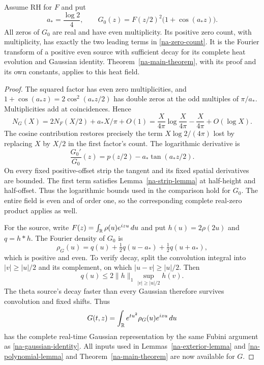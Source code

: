 \begin{proposition}
\label{na-all-multiple-control}
Assume RH for $F$ and put
\begin{equation}
 a_* =\frac{\log2}{4},\qquad
 G_0(z)=F(z/2)^2\bigl(1+\cos(a_*z)\bigr).
 \label{na-control-field}
\end{equation}
All zeros of $G_0$ are real and have even multiplicity. Its positive
zero count, with multiplicity, has exactly the two leading terms in
\eqref{na-zero-count}. It is the Fourier transform of a positive even
source with sufficient decay for its complete heat evolution and
Gaussian identity. Theorem~\ref{na-main-theorem}, with its proof and
its own constants, applies to this heat field.
\end{proposition}
\begin{proof}
The squared factor has even zero multiplicities, and
$1+\cos(a_*z)=2\cos^2(a_*z/2)$ has double zeros at the odd
multiples of $\pi/a_*$. Multiplicities add at coincidences. Hence
\[
 N_G(X)=2N_F(X/2)+a_*X/\pi+O(1)
       =\frac X{4\pi}\log\frac X{4\pi}-\frac X{4\pi}
          +O(\log X).
\]
The cosine contribution restores precisely the term
$X\log2/(4\pi)$ lost by replacing $X$ by $X/2$ in the first
factor's count. The logarithmic derivative is
\begin{equation}
 \frac{G_0'}{G_0}(z)=p(z/2)-a_*\tan(a_*z/2).
 \label{na-control-log-derivative}
\end{equation}
On every fixed positive-offset strip the tangent and its fixed
spatial derivatives are bounded. The first term satisfies
Lemma~\ref{na-strip-lemma} at half-height and half-offset.
Thus the logarithmic bounds used in the comparison hold for $G_0$.
The entire field is even and of order one, so the corresponding
complete real-zero product applies as well.

For the source, write $F(z)=\int_\mathbb R\rho(u)e^{izu}\,du$ and put
$h(u)=2\rho(2u)$ and $q=h*h$. The Fourier density of $G_0$ is
\begin{equation}
 \rho_G(u)=q(u)+\tfrac12q(u-a_*)+\tfrac12q(u+a_*),
 \label{na-control-source}
\end{equation}
which is positive and even. To verify decay, split the convolution
integral into $|v|\ge|u|/2$ and its complement, on which
$|u-v|\ge|u|/2$. Then
\[
 q(u)\le2\|h\|_1\sup_{|v|\ge|u|/2}h(v).
\]
The theta source's decay faster than every Gaussian therefore
survives convolution and fixed shifts. Thus
\[
 G(t,z)=\int_\mathbb R e^{tu^2}\rho_G(u)e^{izu}\,du
\]
has the complete real-time Gaussian representation by the same Fubini
argument as \eqref{na-gaussian-identity}. All inputs used in
Lemmas~\ref{na-exterior-lemma} and \ref{na-polynomial-lemma} and
Theorem~\ref{na-main-theorem} are now available for $G$.
\end{proof}

